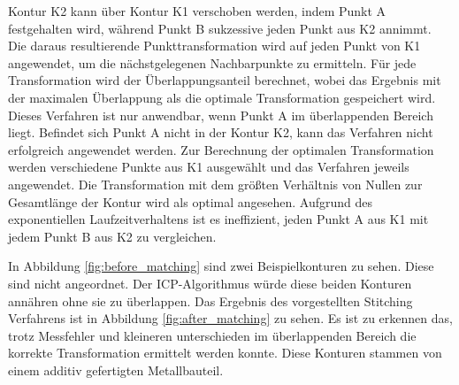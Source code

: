 \documentclass[../main.tex]{subfiles}
\begin{document}
Kontur K2 kann über Kontur K1 verschoben werden, indem Punkt A festgehalten wird, 
während Punkt B sukzessive jeden Punkt aus K2 annimmt. 
Die daraus resultierende Punkttransformation wird auf jeden Punkt von K1 angewendet, 
um die nächstgelegenen Nachbarpunkte zu ermitteln. Für jede Transformation wird der 
Überlappungsanteil berechnet, wobei das Ergebnis mit der maximalen Überlappung
als die optimale Transformation gespeichert wird.
Dieses Verfahren ist nur anwendbar, wenn Punkt A im überlappenden Bereich liegt. 
Befindet sich Punkt A nicht in der Kontur K2, 
kann das Verfahren nicht erfolgreich angewendet werden.
Zur Berechnung der optimalen Transformation werden verschiedene Punkte aus K1 
ausgewählt und das Verfahren jeweils angewendet. 
Die Transformation mit dem größten Verhältnis von Nullen zur
Gesamtlänge der Kontur wird als optimal angesehen. 
Aufgrund des exponentiellen Laufzeitverhaltens ist es ineffizient, 
jeden Punkt A aus K1 mit jedem Punkt B aus K2 zu vergleichen.

In Abbildung \ref{fig:before_matching} sind zwei Beispielkonturen zu sehen. 
Diese sind nicht angeordnet. Der ICP-Algorithmus würde diese beiden Konturen 
annähren ohne sie zu überlappen. 
Das Ergebnis des vorgestellten Stitching Verfahrens ist in Abbildung 
\ref{fig:after_matching} zu sehen. Es ist zu erkennen das, trotz Messfehler und 
kleineren unterschieden im überlappenden Bereich die korrekte Transformation 
ermittelt werden konnte. Diese Konturen stammen von einem additiv gefertigten 
Metallbauteil.
\end{document}
